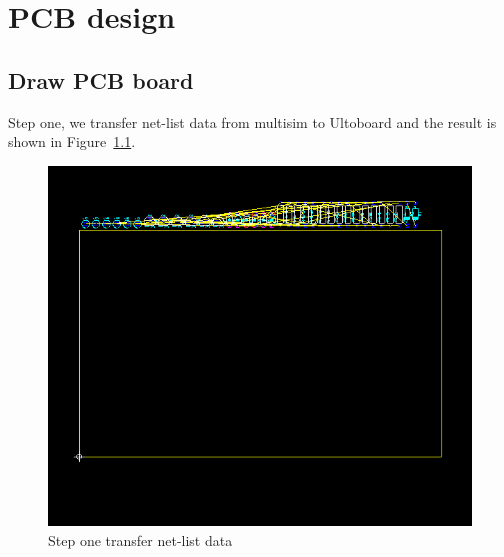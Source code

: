 \chapter{PCB design}  

\section{Draw PCB board}

Step one, we transfer net-list data from multisim to Ultoboard and the result is shown in Figure~\ref{fig:Step one transfer netlist datas}. 

\begin{figure}[htbp]
	\centering
	\includegraphics[scale=0.7]{"../Photo/Chap6/first_inport_netlist"}
	\caption{Step one transfer net-list data}
	\label{fig:Step one transfer netlist datas}
\end{figure}


